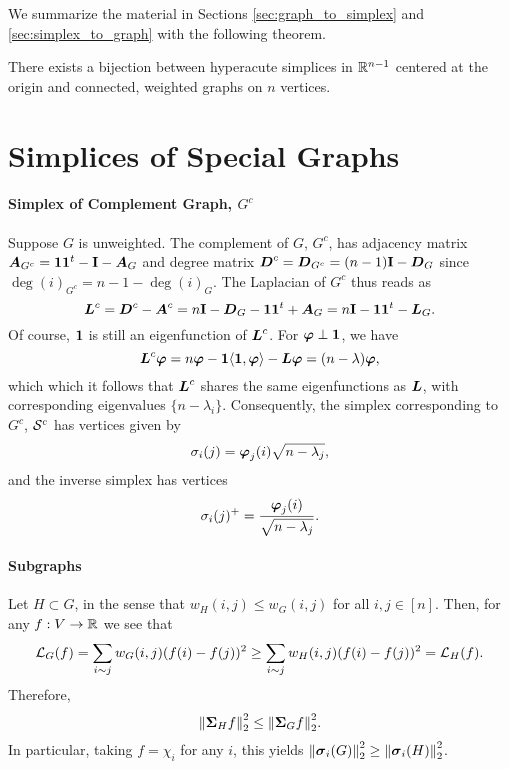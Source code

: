 We summarize the material in Sections \ref{sec:graph_to_simplex} and \ref{sec:simplex_to_graph} with the following theorem. 

\begin{theorem}
	\label{thm:graph-simplex}
	There exists a bijection between hyperacute  simplices in $\mathbb{R}^{n-1}$ centered at the origin and connected, weighted graphs on $n$ vertices. 
\end{theorem}


\section{Simplices of Special Graphs}

\paragraph{Simplex of Complement Graph, $G^c$}
Suppose $G$ is unweighted. The complement of $G$, $G^c$, has adjacency matrix $\vb*{A}_{G^c}=\vb{1}\vb{1}^t - \vb{I}-\vb*{A}_G$ and degree matrix $\vb*{D}^c=\vb*{D}_{G^c}=(n-1)\vb{I}-\vb*{D}_G$ since $\deg(i)_{G^c}=n-1-\deg(i)_G$. The Laplacian of $G^c$ thus reads as 
\[\vb*{L}^c=\vb*{D}^c-\vb*{A}^c=n\vb{I}-\vb*{D}_G-\vb{1}\vb{1}^t+\vb*{A}_G=n\vb{I}-\vb{1}\vb{1}^t-\vb*{L}_G.\]
Of course, $\vb{1}$ is still an eigenfunction of $\vb*{L}^c$. For $\vb*{\varphi}\perp \vb{1}$, we have 
\[\vb*{L}^c\vb*{\varphi} = n\vb*{\varphi} - \vb{1}\langle \vb{1},\vb*{\varphi}\rangle - \vb*{L}\vb*{\varphi} = (n-\lambda)\vb*{\varphi},\]
which which it follows that $\vb*{L}^c$ shares the same eigenfunctions as $\vb*{L}$, with corresponding eigenvalues $\{n-\lambda_i\}$. Consequently, the simplex corresponding to $G^c$, $\mathcal{S}^c$ has vertices given by 
\[\sigma_i(j) = \vb*{\varphi}_j(i) \sqrt{n-\lambda_j},\]
and the inverse simplex has vertices 
\[\sigma_i(j)^+=\frac{\vb*{\varphi}_j(i)}{\sqrt{n-\lambda_j}}. \]



\paragraph{Subgraphs}
Let $H\subset G$, in the sense that $w_H(i,j)\leq w_G(i,j)$ for all $i,j\in [n]$. Then, for any $f:V\to\mathbb{R}$ we see that 
\[\mathcal{L}_G(f)=\sum_{i\sim j}w_G(i,j)(f(i)-f(j))^2 \geq \sum_{i\sim j}w_H(i,j)(f(i)-f(j))^2 =\mathcal{L}_H(f).\]
Therefore, 
\begin{equation*}
\norm{\boldsymbol{\Sigma}_H f}_2^2 \leq \norm{\boldsymbol{\Sigma}_G f}_2^2. 
\end{equation*}
In particular, taking $f=\chi_i$ for any $i$, this yields $\norm{\vb*{\sigma}_i(G)}_2^2\geq \norm{\vb*{\sigma}_i(H)}_2^2$. 

